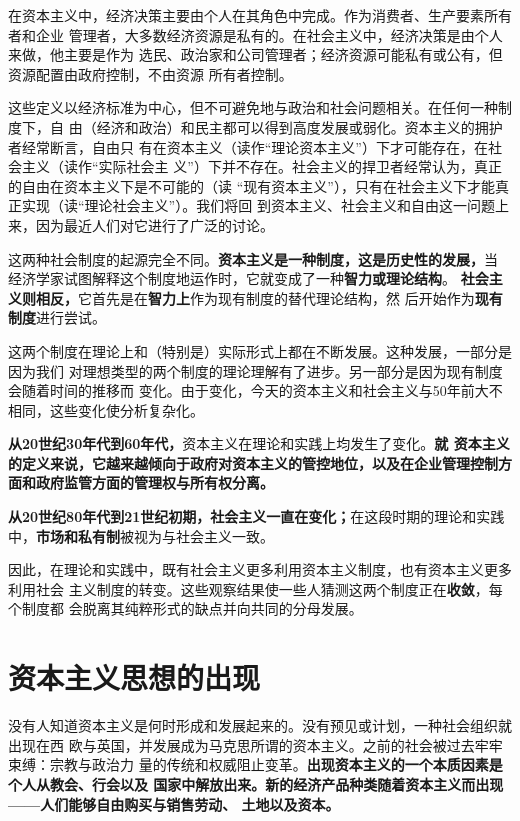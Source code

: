 在资本主义中，经济决策主要由个人在其角色中完成。作为消费者、生产要素所有者和企业
管理者，大多数经济资源是私有的。在社会主义中，经济决策是由个人来做，他主要是作为
选民、政治家和公司管理者；经济资源可能私有或公有，但资源配置由政府控制，不由资源
所有者控制。

这些定义以经济标准为中心，但不可避免地与政治和社会问题相关。在任何一种制度下，自
由（经济和政治）和民主都可以得到高度发展或弱化。资本主义的拥护者经常断言，自由只
有在资本主义（读作“理论资本主义”）下才可能存在，在社会主义（读作“实际社会主
义”）下并不存在。社会主义的捍卫者经常认为，真正的自由在资本主义下是不可能的（读
“现有资本主义”），只有在社会主义下才能真正实现（读“理论社会主义”）。我们将回
到资本主义、社会主义和自由这一问题上来，因为最近人们对它进行了广泛的讨论。

这两种社会制度的起源完全不同。\textbf{资本主义是一种制度，这是历史性的发展，}当
经济学家试图解释这个制度地运作时，它就变成了一种\textbf{智力或理论结构}。
\textbf{社会主义则相反，}它首先是在\textbf{智力上}作为现有制度的替代理论结构，然
后开始作为\textbf{现有制度}进行尝试。

这两个制度在理论上和（特别是）实际形式上都在不断发展。这种发展，一部分是因为我们
对理想类型的两个制度的理论理解有了进步。另一部分是因为现有制度会随着时间的推移而
变化。由于变化，今天的资本主义和社会主义与50年前大不相同，这些变化使分析复杂化。

\textbf{从20世纪30年代到60年代，}资本主义在理论和实践上均发生了变化。\textbf{就
资本主义的定义来说，它越来越倾向于政府对资本主义的管控地位，以及在企业管理控制方
面和政府监管方面的管理权与所有权分离。}

\textbf{从20世纪80年代到21世纪初期，社会主义一直在变化；}在这段时期的理论和实践
中，\textbf{市场和私有制}被视为与社会主义一致。

因此，在理论和实践中，既有社会主义更多利用资本主义制度，也有资本主义更多利用社会
主义制度的转变。这些观察结果使一些人猜测这两个制度正在\textbf{收敛}，每个制度都
会脱离其纯粹形式的缺点并向共同的分母发展。

\section{资本主义思想的出现}

没有人知道资本主义是何时形成和发展起来的。没有预见或计划，一种社会组织就出现在西
欧与英国，并发展成为马克思所谓的资本主义。之前的社会被过去牢牢束缚：宗教与政治力
量的传统和权威阻止变革。\textbf{出现资本主义的一个本质因素是个人从教会、行会以及
国家中解放出来。新的经济产品种类随着资本主义而出现——人们能够自由购买与销售劳动、
土地以及资本。}

